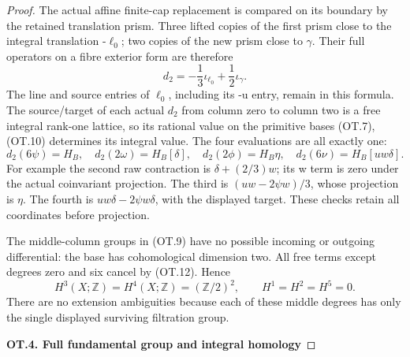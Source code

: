 \begin{proof}
The actual affine finite-cap replacement is compared on its boundary by
the retained translation prism. Three lifted copies of the first prism
close to the integral translation -\(\ell_0\); two copies of the new prism
close to \(\gamma\). Their full operators on a fibre exterior form are
therefore
\[
             d_2=-\frac13\iota_{\ell_0}
                         +\frac12\iota_\gamma.           \tag{OT.11}
\]
The line and source entries of \(\ell_0\), including its -u entry, remain in
this formula. The source/target of each actual \(d_2\) from column zero to
column two is a free integral rank-one lattice, so its rational value
on the primitive bases (OT.7),(OT.10) determines its integral value.
The four evaluations are all exactly one:
\[
 d_2(6\psi)=H_B,\quad
 d_2(2\omega)=H_B[\delta],\quad
 d_2(2\phi)=H_B\eta,\quad
 d_2(6\nu)=H_B[uw\delta].                              \tag{OT.12}
\]
For example the second raw contraction is \(\delta+(2/3)w\); its w term is
zero under the actual coinvariant projection. The third is
\((uw-2\psi w)/3\), whose projection is \(\eta\). The fourth is
\(uw\delta-2\psi w\delta\), with the displayed target. These checks retain
all coordinates before projection.

The middle-column groups in (OT.9) have no possible incoming or outgoing
differential: the base has cohomological dimension two. All free terms
except degrees zero and six cancel by (OT.12). Hence
\[
 H^3(X;\mathbb Z)=H^4(X;\mathbb Z)=(\mathbb Z/2)^2,
 \qquad H^1=H^2=H^5=0.                                  \tag{OT.13}
\]
There are no extension ambiguities because each of these middle degrees
has only the single displayed surviving filtration group.

\par

\medskip\noindent\textbf{OT.4. Full fundamental group and integral homology}

\par\nobreak


\end{proof}
